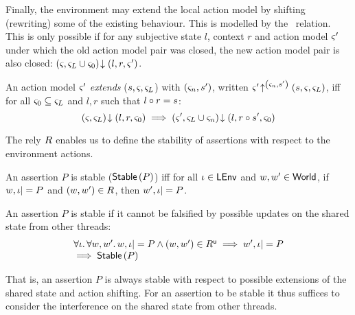 Finally, the environment may extend the local action model by shifting (rewriting) some of the existing behaviour. This is modelled by the \shiftR\ relation. This is only possible if for any subjective state $l$, context $r$ and action model $\varsigma_{}'$ under which the old action model pair was closed, the new action model pair is also closed: $\left(\varsigma_{}, \varsigma_{L} \cup \varsigma_{0}\right) \!\downarrow \left(l, r, \varsigma_{}'\right)$. 
%
%
\begin{definition}\label{def:amodExtension}
An action model $\varsigma_{}'$ \emph{extends}  ($s, \varsigma_{}, \varsigma_{L}$) with $(\varsigma_{n}, s')$, written $\varsigma_{}' \!\uparrow^{\left(\varsigma_{n}, s'\right)} \left(s, \varsigma_{}, \varsigma_{L}\right)$, iff for all $\varsigma_{0} \subseteq \varsigma_{L}$ and $l, r$ such that $l \circ r = s$:
%
\[
	\left(\varsigma_{}, \varsigma_{L}\right) \!\downarrow \left(l, r, \varsigma_{0}\right) \implies \left(\varsigma_{}', \varsigma_{L} \cup \varsigma_{n}\right) \!\downarrow \left(l, r\circ s', \varsigma_{0}\right)
\]
%
\end{definition}
%
%
The rely $R$ enables us to define the stability of assertions with respect to the environment actions.
%
\begin{definition}[Stability] An assertion $P$ is stable ($\textsf{Stable}\left(P\right)$) iff for all $\iota \in \textsf{LEnv}$ and $w, w' \in \textsf{World}$, if $w, \iota |= P$ and $(w, w') \in R$, then $w', \iota |= P$.
\end{definition}
%
\begin{lemma}[Stability]
An assertion $P$ is stable if it cannot be falsified by possible updates on the shared state from other threads:
%
\[
\begin{array}{l}
	\forall \iota.\,\forall w, w'.\, 
    w, \iota |= P \land (w, w') \in R^{\textsf{u}} \implies
	 	w', \iota |= P\\
	 
	 \implies \textsf{Stable}\left(P\right)
\end{array}	 
\]
%
\end{lemma}
%
That is, an assertion $P$ is always stable with respect to possible extensions of the shared state and action shifting. For an assertion to be stable it thus suffices to consider the interference on the shared state from other threads.

